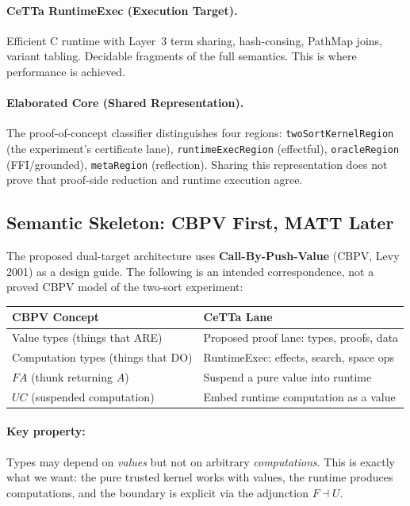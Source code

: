 \documentclass[11pt]{article}
\newcommand{\code}[1]{\texttt{#1}}
\newcommand{\PathMap}{\textup{PathMap}}
\begin{document}
\paragraph{CeTTa RuntimeExec (Execution Target).}
Efficient C runtime with Layer~3 term sharing, hash-consing, \PathMap{}
joins, variant tabling.  Decidable fragments of the full semantics.
This is where performance is achieved.

\paragraph{Elaborated Core (Shared Representation).}
The proof-of-concept classifier distinguishes four regions:
\code{twoSortKernelRegion} (the experiment's certificate lane),
\code{runtimeExecRegion} (effectful), \code{oracleRegion} (FFI/grounded),
\code{metaRegion} (reflection). Sharing this representation does not prove
that proof-side reduction and runtime execution agree.

\subsection{Semantic Skeleton: CBPV First, MATT Later}

The proposed dual-target architecture uses \textbf{Call-By-Push-Value}
(CBPV, Levy 2001) as a design guide. The following is an intended
correspondence, not a proved CBPV model of the two-sort experiment:

\begin{center}
\begin{tabular}{ll}
\toprule
\textbf{CBPV Concept} & \textbf{CeTTa Lane} \\
\midrule
Value types (things that ARE) & Proposed proof lane: types, proofs, data \\
Computation types (things that DO) & RuntimeExec: effects, search, space ops \\
$F A$ (thunk returning $A$) & Suspend a pure value into runtime \\
$U C$ (suspended computation) & Embed runtime computation as a value \\
\bottomrule
\end{tabular}
\end{center}

\paragraph{Key property:} Types may depend on \emph{values} but not on
arbitrary \emph{computations}.  This is exactly what we want: the pure
trusted kernel works with values, the runtime produces computations,
and the boundary is explicit via the adjunction $F \dashv U$.
\end{document}

